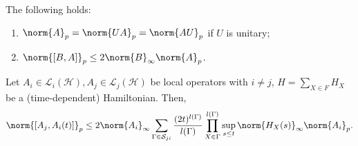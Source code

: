 \begin{fact}[]
    The following holds:
    \begin{enumerate}[1)]
      \item \(\norm{A}_{p}= \norm{UA}_{p}=\norm{AU}_{p}\) if \(U\) is unitary;
      \item \(\norm{[B,A]}_{p} \leq 2\norm{B}_{\infty} \norm{A}_{p}\).
    \end{enumerate}    
\end{fact}


\begin{thm}
  \label{detpathsum}
    Let \(A_i \in \mathcal{L}_i(\mathcal{H}),A_j \in \mathcal{L}_j(\mathcal{H})\) be local operators with \(i \neq j\), \(H=\sum_{X \in F}^{} H_X\) be a (time-dependent) Hamiltonian. Then, 
    \[\norm{[A_j,A_i(t)]}_{p} \leq 2 \norm{A_i}_{\infty} \sum_{\Gamma \in \mathcal{S}_{ji}}^{} \frac{(2t)^{l(\Gamma )}}{l(\Gamma )} \prod_{X \in \Gamma }^{l(\Gamma )} \sup_{s \leq t} \norm{H_{X}(s)}_{\infty} \norm{A_i}_{p}.\]
\end{thm}

